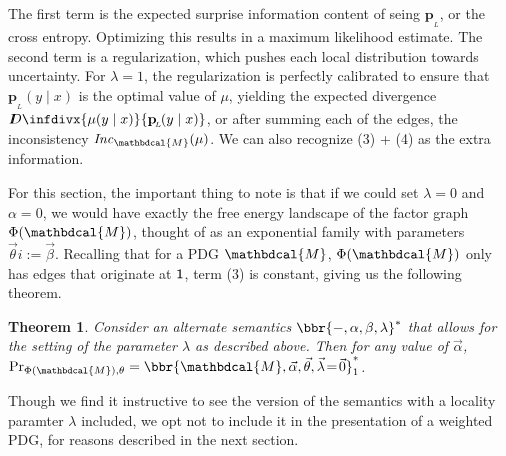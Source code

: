 \documentclass[letterpaper]{article} %
\theoremstyle{plain}
\newtheorem{theorem}{Theorem}%
\theoremstyle{definition}
\theoremstyle{remark}
\newcommand{\thickD}{I\mkern-8muD}
\newcommand{\kldiv}{\thickD\infdivx}
\newcommand\mat[1]{\mathbf{#1}}
\newcommand{\bp}[1][L]{\mat{p}_{\!_{#1}\!}}
\newcommand{\dg}[1]{\mathbdcal{#1}}
\newcommand\Inc{\mathit{Inc}}
\begin{document}
The first term is the expected surprise information content of seing $\bp$, or the cross entropy. Optimizing this results in a maximum likelihood estimate. The second term is a regularization, which pushes each local distribution towards uncertainty. For $\lambda = 1$, the regularization is perfectly calibrated to ensure that $\bp(y \mid x)$ is the optimal value of $\mu$, yielding the expected divergence $\kldiv{\mu(y\mid x)}{\bp(y\mid x)}$, or after summing each of the edges, the inconsistency $\Inc_{\dg M}( \mu)$. We can also recognize (3) + (4) as the extra information.

For this section, the important thing to note is that if we could set $\lambda = 0$ and $\alpha = 0$, we would have exactly the free energy landscape of the factor graph $\Phi(\dg M)$, thought of as an exponential family with parameters $\vec \theta i:= \vec \beta$. Recalling that for a PDG $\dg M$, $\Phi(\dg M)$ only has edges that originate at $\sf 1$, term (3) is constant, giving us the following theorem.

\begin{theorem}
	Consider an alternate semantics $\bbr{-, \alpha, \beta, \lambda}^*$ that allows for the setting of the parameter $\lambda$ as described above. Then for any value of $\vec\alpha$, $\Pr_{\Phi(\dg M),\theta} = \bbr{\dg M, \vec{\alpha}, \vec{\theta}, \vec\lambda \!=\! \vec 0 }^*_1$.
\end{theorem}

Though we find it instructive to see the version of the semantics with a locality paramter $\lambda$ included, we opt not to include it in the presentation of a weighted PDG, for reasons described in the next section.
\end{document}
